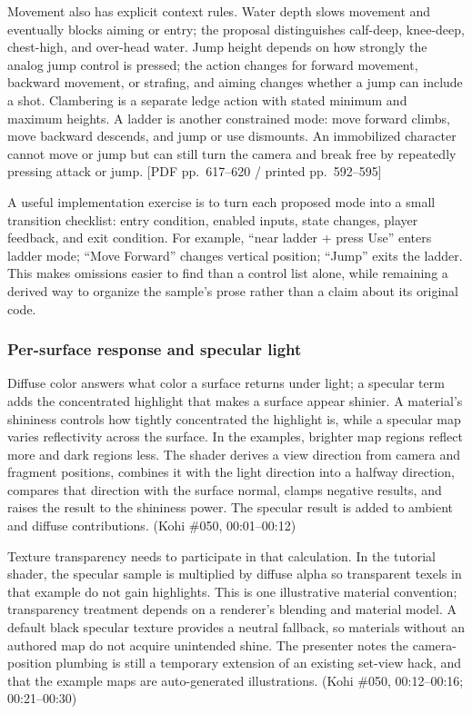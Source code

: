 Movement also has explicit context rules. Water depth slows movement and eventually blocks aiming or entry; the proposal distinguishes calf-deep, knee-deep, chest-high, and over-head water. Jump height depends on how strongly the analog jump control is pressed; the action changes for forward movement, backward movement, or strafing, and aiming changes whether a jump can include a shot. Clambering is a separate ledge action with stated minimum and maximum heights. A ladder is another constrained mode: move forward climbs, move backward descends, and jump or use dismounts. An immobilized character cannot move or jump but can still turn the camera and break free by repeatedly pressing attack or jump. {[}PDF pp.~617--620 / printed pp.~592--595{]}

A useful implementation exercise is to turn each proposed mode into a small transition checklist: entry condition, enabled inputs, state changes, player feedback, and exit condition. For example, ``near ladder + press Use'' enters ladder mode; ``Move Forward'' changes vertical position; ``Jump'' exits the ladder. This makes omissions easier to find than a control list alone, while remaining a derived way to organize the sample's prose rather than a claim about its original code.

\subsubsection{Per-surface response and specular light}\label{06-engine-ii-ch026-per-surface-response-and-specular-light}

\hypertarget{06-engine-ii-ch026-per-surface-response-and-specular-light}{}

Diffuse color answers what color a surface returns under light; a specular term adds the concentrated highlight that makes a surface appear shinier. A material's shininess controls how tightly concentrated the highlight is, while a specular map varies reflectivity across the surface. In the examples, brighter map regions reflect more and dark regions less. The shader derives a view direction from camera and fragment positions, combines it with the light direction into a halfway direction, compares that direction with the surface normal, clamps negative results, and raises the result to the shininess power. The specular result is added to ambient and diffuse contributions. (Kohi \#050, 00:01--00:12)

Texture transparency needs to participate in that calculation. In the tutorial shader, the specular sample is multiplied by diffuse alpha so transparent texels in that example do not gain highlights. This is one illustrative material convention; transparency treatment depends on a renderer's blending and material model. A default black specular texture provides a neutral fallback, so materials without an authored map do not acquire unintended shine. The presenter notes the camera-position plumbing is still a temporary extension of an existing set-view hack, and that the example maps are auto-generated illustrations. (Kohi \#050, 00:12--00:16; 00:21--00:30)

